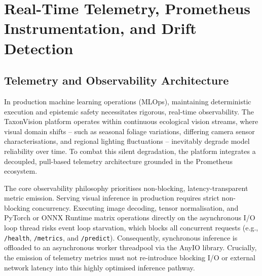 \chapter{Real-Time Telemetry, Prometheus Instrumentation, and Drift Detection}
\label{ch:telemetry_and_drift}


\section{Telemetry and Observability Architecture}
\label{sec:telemetry_architecture}

In production machine learning operations (MLOps), maintaining deterministic execution and epistemic safety necessitates rigorous, real-time observability. The TaxonVision platform operates within continuous ecological vision streams, where visual domain shifts -- such as seasonal foliage variations, differing camera sensor characterisations, and regional lighting fluctuations -- inevitably degrade model reliability over time. To combat this silent degradation, the platform integrates a decoupled, pull-based telemetry architecture grounded in the Prometheus ecosystem.

The core observability philosophy prioritises non-blocking, latency-transparent metric emission. Serving visual inference in production requires strict non-blocking concurrency. Executing image decoding, tensor normalisation, and PyTorch or ONNX Runtime matrix operations directly on the asynchronous I/O loop thread risks event loop starvation, which blocks all concurrent requests (e.g., \texttt{/health}, \texttt{/metrics}, and \texttt{/predict}). Consequently, synchronous inference is offloaded to an asynchronous worker threadpool via the AnyIO library. Crucially, the emission of telemetry metrics must not re-introduce blocking I/O or external network latency into this highly optimised inference pathway.

